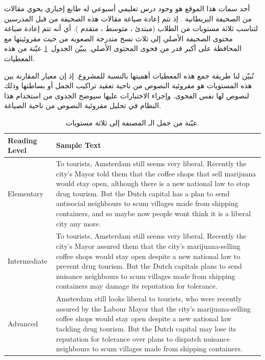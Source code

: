 أحد سمات هذا الموقع هو وجود درس تعليمي أسبوعي له طابع إخباري يحوي مقالات من الصحيفة البريطانية .
إذ تتم إعادة صياغة مقالات هذه الصحيفة من قبل المدرسين لتناسب ثلاثة مستويات من الطلاب
(مبتدئ ، متوسط ، متقدم ).
أي أنه تتم إعادة صياغة محتوى الصحيفة الأصلي إلى ثلاث نسخ متدرجة الصعوبة من حيث مقروئيتها مع المحافظة على أكبر قدر من فحوى المحتوى الأصلي.
يبيّن الجدول~\ref{tbl:corpus:ose} عيّنة من هذه المعطيات.

تُبيّن لنا طريقة جمع هذه المعطيات أهميتها بالنسبة للمشروع.
إذ إن معيار المقارنة بين هذه المستويات هو مقروئية النصوص من ناحية تعقيد تراكيب الجمل أو بساطتها وذلك لنصوص لها نفس الفحوى.
وإجراء الاختبارات عليها سيوضح الجدوى من استخدام هذا النظام في تحليل مقروئية النصوص من ناحية الصياغة.

\begin{table}[htb]
	\centering
	{
		\setlength{\tabcolsep}{0.5em} %
		\renewcommand{\arraystretch}{1.4}%
		
		\begin{tabular}{|>{\arraybackslash}p{}|>{\arraybackslash}p{}|}
			\hline
			\textbf{Reading Level} &
			\textbf{Sample Text} \\
			\hline 
			Elementary &
			To tourists, Amsterdam still seems very liberal. Recently the city’s Mayor told
			them that the coffee shops that sell marijuana would stay open, although there
			is a new national law to stop drug tourism. But the Dutch capital has a plan
			to send antisocial neighbours to scum villages made from shipping containers,
			and so maybe now people wont think it is a liberal city any more. \\
			\hline 
			Intermediate &
			To tourists, Amsterdam still seems very liberal. Recently the city’s Mayor assured them that the city’s marijuana-selling coffee shops would stay open despite a new national law to prevent drug tourism. But the Dutch capitals plans
			to send nuisance neighbours to scum villages made from shipping containers
			may damage its reputation for tolerance. \\
			\hline 
			Advanced &
			Amsterdam still looks liberal to tourists, who were recently assured by the
			Labour Mayor that the city’s marijuana-selling coffee shops would stay open
			despite a new national law tackling drug tourism. But the Dutch capital may
			lose its reputation for tolerance over plans to dispatch nuisance neighbours to
			scum villages made from shipping containers. \\
			\hline 
		\end{tabular}
	}
	\caption{%
		عيّنة من جمل الـ  المصنفة إلى ثلاثة مستويات.
	}
	\label{tbl:corpus:ose}
\end{table}

